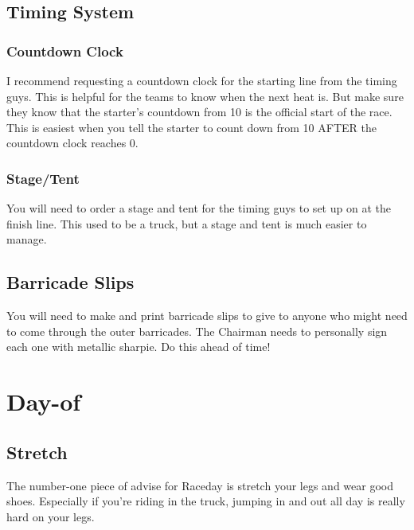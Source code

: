 \subsection{Timing System}
\subsubsection{Countdown Clock}
I recommend requesting a countdown clock for the starting line from the
timing guys. This is helpful for the teams to know when the next heat is.
But make sure they know that the starter's countdown from 10 is the official
start of the race. This is easiest when you tell the starter to count down
from 10 AFTER the countdown clock reaches 0.

\subsubsection{Stage/Tent}
You will need to order a stage and tent for the timing guys to set up on at
the finish line. This used to be a truck, but a stage and tent is much easier
to manage.

\subsection{Barricade Slips}
You will need to make and print barricade slips to give to anyone who might
need to come through the outer barricades. The Chairman needs to personally
sign each one with metallic sharpie. Do this ahead of time!


\section{Day-of}
\subsection{Stretch}
The number-one piece of advise for Raceday is stretch your legs and wear
good shoes. Especially if you're riding in the truck, jumping in and out all
day is really hard on your legs.

